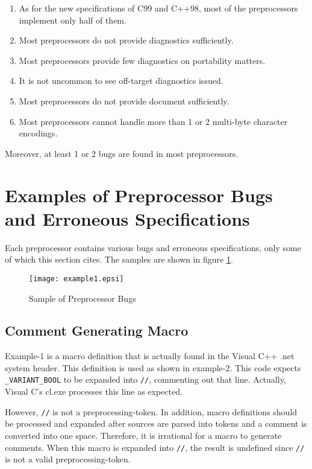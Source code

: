 \documentclass[twocolumn]{article}
\begin{document}
\begin{enumerate}
\item As for the new specifications of C99 and C++98, most of the preprocessors implement only half of them.
\item Most preprocessors do not provide diagnostics sufficiently.
\item Most preprocessors provide few diagnostics on portability matters.
\item It is not uncommon to see off-target diagnostics issued.
\item Most preprocessors do not provide document sufficiently.
\item Most preprocessors cannot handle more than 1 or 2 multi-byte character encodings.
\end{enumerate}

Moreover, at least 1 or 2 bugs are found in most preprocessors.

\section{Examples of Preprocessor Bugs and Erroneous Specifications}

Each preprocessor contains various bugs and erroneous specifications, only some of which this section cites.  The samples are shown in figure \ref{bugs}.

\begin{figure}
\texttt{[image: example1.epsi]}
\caption{Sample of Preprocessor Bugs}
\label{bugs}
\end{figure}%

\subsection{Comment Generating Macro}

Example-1 is a macro definition that is actually found in the Visual C++ .net system header.  This definition is used as shown in example-2.  This code expects \verb|_VARIANT_BOOL| to be expanded into \verb|//|, commenting out that line.  Actually, Visual C's cl.exe processes this line as expected.

However, \verb|//| is not a preprocessing-token.  In addition, macro definitions should be processed and expanded after sources are parsed into tokens and a comment is converted into one space.  Therefore, it is irrational for a macro to generate comments.  When this macro is expanded into \verb|//|, the result is undefined since \verb|//| is not a valid preprocessing-token.
\end{document}
